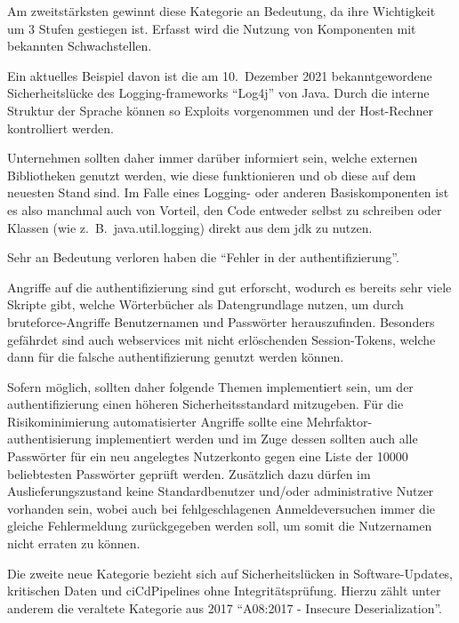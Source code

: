 	Am zweitstärksten gewinnt diese Kategorie an Bedeutung,
	da ihre Wichtigkeit um 3 Stufen gestiegen ist.
	Erfasst wird die Nutzung von Komponenten mit bekannten Schwachstellen.

	Ein aktuelles Beispiel davon ist die am 10.\ Dezember 2021 bekanntgewordene Sicherheitslücke
	des Logging-\glspl{framework} \enquote{Log4j} von Java.
	Durch die interne Struktur der Sprache können so Exploits vorgenommen und der Host-Rechner kontrolliert werden.

	Unternehmen sollten daher immer darüber informiert sein,
	welche externen Bibliotheken genutzt werden,
	wie diese funktionieren und ob diese auf dem neuesten Stand sind.
	Im Falle eines Logging- oder anderen Basiskomponenten
	ist es also manchmal auch von Vorteil,
	den Code entweder selbst zu schreiben oder Klassen (wie z.\ B.\ java.util.logging)
	direkt aus dem \gls{jdk} zu nutzen.

	Sehr an Bedeutung verloren haben die \enquote{Fehler in der \gls{authentifizierung}}.

	Angriffe auf die \gls{authentifizierung} sind gut erforscht,
	wodurch es bereits sehr viele Skripte gibt,
	welche Wörterbücher als Datengrundlage nutzen,
	um durch \gls{bruteforce}-Angriffe Benutzernamen und Passwörter herauszufinden.
	Besonders gefährdet sind auch \glspl{webservice} mit nicht erlöschenden Session-Tokens,
	welche dann für die falsche \gls{authentifizierung} genutzt werden können.

	Sofern möglich, sollten daher folgende Themen implementiert sein,
	um der \gls{authentifizierung} einen höheren Sicherheitsstandard mitzugeben.
	Für die Risikominimierung automatisierter Angriffe
	sollte eine Mehrfaktor-\gls{authentisierung} implementiert werden
	und im Zuge dessen sollten auch alle Passwörter für ein neu angelegtes Nutzerkonto
	gegen eine Liste der 10000 beliebtesten Passwörter geprüft werden.
	Zusätzlich dazu dürfen im Auslieferungszustand keine Standardbenutzer
	und/oder administrative Nutzer vorhanden sein,
	wobei auch bei fehlgeschlagenen Anmeldeversuchen immer die gleiche Fehlermeldung zurückgegeben werden soll,
	um somit die Nutzernamen nicht erraten zu können.

	Die zweite neue Kategorie bezieht sich auf Sicherheitslücken in Software-Updates,
	kritischen Daten und \glspl{ciCdPipeline} ohne Integritätsprüfung.
	Hierzu zählt unter anderem die veraltete Kategorie aus 2017 \enquote{A08:2017 - Insecure Deserialization}.


